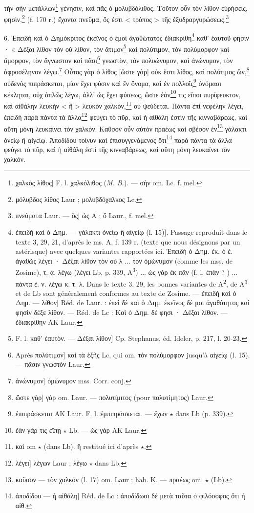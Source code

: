 \documentclass[landscape, a4paper, 11pt, oneside, polutonikogreek, french]{article}
\begin{document}
τὴν σὴν μετάλλων\footnote{χαλκὸς λίθος] F. l. χαλκόλιθος (\emph{M. B.}). --- σὴν om. Lc. f. mel.} γένησιν, καὶ πᾶς ὁ μολυβδόλιθος. Τοῦτον οὖν τὸν λίθον εὑρήσεις, φησὶν,\footnote{μόλυβδος λίθος Laur ; μολυβδόχαλκος Lc.} (f. 170 r.) ἔχοντα πνεῦμα, ὅς ἐστι < τρόπος > τῆς ἐξυδραργυρώσεως.\footnote{πνεύματα Laur. --- ὅς] ὡς A ; ὅ Laur., f. mel.}

 

6. Ἐπειδὴ καὶ ὁ Δημόκριτος ἐκεῖνος ὁ ἐμοὶ ἀγαθώτατος ἐδιακρίθη\footnote{ἐπειδὴ καὶ ὁ Δημ. --- γάλακτι ὀνείῳ ἢ αἰγείῳ (l. 15)]. Passage reproduit dans le texte 3, 29, 21, d'après le ms. A, f. 139 r. (texte que nous désignons par un astérisque) avec quelques variantes rapportées ici. Ἐπειδὴ ὁ Δημ. ἐκ. ὁ ἐ. ἀγαθῶς λέγει · Δέξαι λίθον τὸν οὐ λ ... τὸν ὀμώνυμον (comme les mss. de Zosime), τ. ἀ. λέγω (λέγει Lb, p. 339, A\textsuperscript{3}) ... ὡς γὰρ ἐκ πᾶν (f. l. ἐπὰν ? ) ... πάντα ἐ. ν. λέγω κ. τ. λ. Dans le texte 3. 29, les bonnes variantes de A\textsuperscript{2}, de A\textsuperscript{3} et de Lb sont généralement conformes au texte de Zosime. --- ἐπειδὴ καὶ ὁ Δημ. --- λίθον] Réd. de Laur. : ἐπεὶ δὲ καὶ ὁ Δημ. ἐκεῖνος δὲ μοι ἀγαθότητος καὶ φησὶν δέξε λίθον. --- Réd. de Lc : Καὶ ὁ Δημ. δέ φησι · Δέξαι λίθον. --- ἐδιακρίθην AK Laur.} καθ' ἑαυτοῦ φησιν · « Δέξαι λίθον τὸν οὐ λίθον, τὸν ἄτιμον\footnote{F. l. καθ' ἑαυτὸν. --- Δέξαι λίθον] Cp. Stephanus, éd. Ideler, p. 217, l. 20-23.} καὶ πολύτιμον, τὸν πολύμορφον καὶ ἄμορφον, τὸν ἄγνωστον καὶ πᾶσι\footnote{Après πολύτιμον] καὶ τὰ ἑξῆς Lc, qui om. τὸν πολύμορφον jusqu'à αἰγείῳ (l. 15). --- πᾶσιν γνωστὸν Laur.} γνωστὸν, τὸν πολυώνυμον, καὶ ἀνώνυμον, τὸν ἀφροσέληνον λέγω.\footnote{ἀνώνυμον] ὁμώνυμον mss. Corr. conj.} Οὗτος γὰρ ὁ λίθος [ὥστε γὰρ] οὐκ ἔστι λίθος, καὶ πολύτιμος ὢν,\footnote{ὥστε γὰρ] γὰρ om. Laur. --- πολυτίμιτος (pour πολυτίμητος) Laur.} οὐδενὸς πιπράσκεται, μίαν ἔχει φύσιν καὶ ἓν ὄνομα, καὶ ἐν πολλοῖς\footnote{ἐπιπράσκεται AK Laur. F. l. ἐμπιπράσκεται. --- ἔχων $\star$ dans Lb (p. 339).} ὀνόμασι κέκληται, οὐχ ἁπλῶς λέγω, ἀλλ' ὡς ἔχει φύσεως, ὥστε ἐάν\footnote{ἐὰν γάρ τις εἴπῃ $\star$ Lb. --- ὡς γὰρ AK Laur.} τις εἴποι πυρίφευκτον, καὶ αἰθάλην λευκὴν < ἢ > λευκὸν χαλκὸν,\footnote{καὶ om $\star$ (dans Lb). ἢ restitué ici d'après $\star$.} οὐ ψεύδεται. Πάντα ἐπὶ νεφέλην λέγει, ἐπειδὴ παρὰ πάντα τὰ ἄλλα\footnote{λέγει] λέγων Laur ; λέγω $\star$ dans Lb.} φεύγει τὸ πῦρ, καὶ ἡ αἰθάλη ἐστὶν τῆς κινναβάρεως, καὶ αὕτη μόνη λευκαίνει τὸν χαλκόν. Καῦσον οὖν αὐτὸν πραέως καὶ σβέσον ἐν\footnote{καῦσον --- τὸν χαλκόν (l. 17) om. Laur ; hab. K. --- πραέως om. $\star$ (Lb).} γάλακτι ὀνείῳ ἢ αἰγείῳ. Ἀποδίδου τοίνυν καὶ ἐπισυγγενάμενος ὅτι\footnote{ἀποδίδου --- ἡ αἰθάλη] Réd. de Lc : ἀποδίδωσι δὲ μετὰ ταῦτα ὁ φιλόσοφος ὅτι ἡ αἰθ.} παρὰ πάντα τὰ ἄλλα φεύγει τὸ πῦρ, καὶ ἡ αἰθάλη ἐστὶ τῆς κινναβάρεως, καὶ αὕτη μόνη λευκαίνει τὸν χαλκόν.
\end{document}

